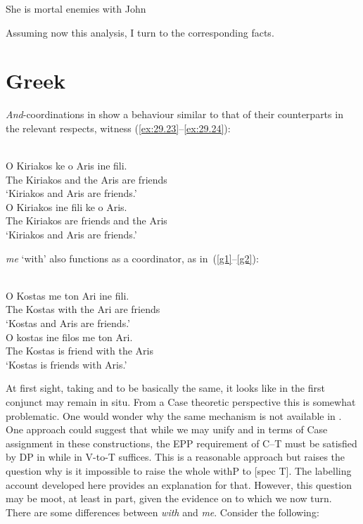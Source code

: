 \documentclass[output=paper]{langsci/langscibook}
\begin{document}
\ea\label{enem}
    She is mortal enemies with John
\z

Assuming now this analysis, I turn to the corresponding  facts.

\section{Greek} \label{greda}

\emph{And}-coordinations in  show a behaviour similar to that of
their  counterparts in the relevant respects, witness
(\ref{ex:29.23}--\ref{ex:29.24}):

\ea\label{ex:29.23} \\
    \gll    O Kiriakos ke o Aris ine fili.\\
            The Kiriakos and the Aris are friends \\ \label{g5}
    \glt    \enquote*{Kiriakos and Aris are friends.}
\ex\label{ex:29.24} \\
    \gll    \llap{*}O Kiriakos ine fili ke o Aris.\\
            The Kiriakos are friends and the Aris\\
    \glt    \enquote*{Kiriakos and Aris are friends.}
\z

 \emph{me} \enquote*{with} also functions as a coordinator, as
in~(\ref{g1}--\ref{g2}):

\ea\label{ex:29.25} \\
    \gll    O Kostas me ton Ari ine fili.\\
            The Kostas with the Ari are friends\\ \label{g1}
    \glt    \enquote*{Kostas and Aris are friends.}
\ex\label{ex:29.26} \\
    \gll    O kostas ine filos me ton Ari.\\
            The Kostas is friend with the Aris\\ \label{g2}
    \glt    \enquote*{Kostas is friends with Aris.}
\z

At first sight, taking  and  to be basically the same,
it looks like in  the first conjunct may remain in situ. From
a Case theoretic perspective this is somewhat problematic. One would wonder why
the same mechanism is not available in . One approach could
suggest that while we may unify  and  in terms of Case
assignment in these constructions, the \gls{EPP} requirement of C--T must be satisfied by DP
 in  while in  V-to-T suffices. This is a
reasonable approach but raises the question why is it impossible to raise the
whole withP to [spec T]. The labelling account developed here
provides an explanation for that. However, this question may be moot, at least
in part, given the evidence on  to which we now turn. There are
some differences between \emph{with} and \emph{me}. Consider the following:
\end{document}
